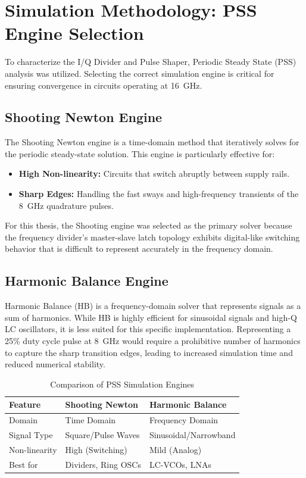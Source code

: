 \documentclass[12pt, a4paper]{report}
\begin{document}
\section{Simulation Methodology: PSS Engine Selection}
To characterize the I/Q Divider and Pulse Shaper, Periodic Steady State (PSS) analysis was utilized. Selecting the correct simulation engine is critical for ensuring convergence in circuits operating at 16~GHz.

\subsection{Shooting Newton Engine}
The Shooting Newton engine is a time-domain method that iteratively solves for the periodic steady-state solution. This engine is particularly effective for:
\begin{itemize}
    \item \textbf{High Non-linearity:} Circuits that switch abruptly between supply rails.
    \item \textbf{Sharp Edges:} Handling the fast sways and high-frequency transients of the 8~GHz quadrature pulses.
\end{itemize}
For this thesis, the Shooting engine was selected as the primary solver because the frequency divider's master-slave latch topology exhibits digital-like switching behavior that is difficult to represent accurately in the frequency domain.

\subsection{Harmonic Balance Engine}
Harmonic Balance (HB) is a frequency-domain solver that represents signals as a sum of harmonics. While HB is highly efficient for sinusoidal signals and high-Q LC oscillators, it is less suited for this specific implementation. Representing a 25\% duty cycle pulse at 8~GHz would require a prohibitive number of harmonics to capture the sharp transition edges, leading to increased simulation time and reduced numerical stability.

\begin{table}[H]
\centering
\caption{Comparison of PSS Simulation Engines}
\label{tab:pss_engines}
\begin{tabular}{@{}lll@{}}
\toprule
\textbf{Feature} & \textbf{Shooting Newton} & \textbf{Harmonic Balance} \\ \midrule
Domain           & Time Domain              & Frequency Domain          \\
Signal Type      & Square/Pulse Waves       & Sinusoidal/Narrowband     \\
Non-linearity    & High (Switching)         & Mild (Analog)             \\
Best for         & Dividers, Ring OSCs      & LC-VCOs, LNAs             \\ \bottomrule
\end{tabular}
\end{table}
\end{document}
